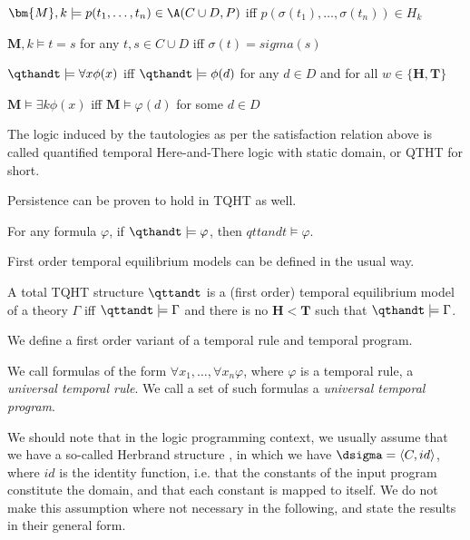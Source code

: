 \begin{description}
  \item $\bm{M},k \models p(t_1, \dots, t_n) \in \A(C \cup D,P)$ iff $p(\sigma(t_1), \dots, \sigma(t_n))\in H_k$
  \item $\bm{M},k \models t = s$ for any $t,s \in C \cup D$ iff $\sigma(t) = sigma(s)$
  \item $\qthandt \models \forall x \phi(x)$ iff $\qthandt \models \phi(d)$ for any $d \in D$ and for all $w \in \{\bm{H}, \bm{T}\}$ 
  \item $\bm{M} \models \exists k \phi(x)$ iff $\bm{M} \models \varphi(d)$ for some $d \in D$
\end{description}

The logic induced by the tautologies as per the satisfaction relation
above is called quantified temporal Here-and-There logic with static
domain, or QTHT for short.

Persistence can be proven to hold in TQHT as well.

\begin{proposition}
For any formula $\varphi$, if $\qthandt \models \varphi$, then $qttandt \models \varphi$.
\end{proposition}

First order temporal equilibrium models can be defined in the usual way.

\begin{definition}
  A total TQHT structure $\qttandt$ is a (first order) temporal
  equilibrium model of a theory $\Gamma$ iff $\qttandt \models \Gamma$
  and there is no $\bm{H} < \bm{T}$ such that
  $\qthandt \models \Gamma$.
\end{definition}

We define a first order variant of a temporal rule and temporal program.

\begin{definition} We call
  formulas of the form $\forall x_1, \dots, \forall x_n \varphi$,
  where $\varphi$ is a temporal rule, a \emph{universal temporal rule}. We
  call a set of such formulas a \emph{universal temporal program}.
\end{definition}

We should note that in the logic programming context, we usually
assume that we have a so-called Herbrand structure \cite{peaval06a},
in which we have $\dsigma = \langle C, id \rangle$, where $id$ is the
identity function, i.e. that the constants of the input program
constitute the domain, and that each constant is mapped to itself. We
do not make this assumption where not necessary in the following, and
state the results in their general form.

